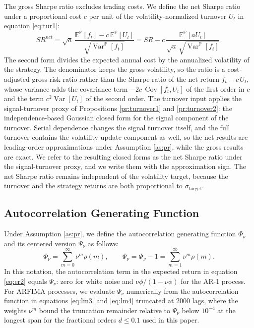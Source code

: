 \documentclass[hidelinks]{siamonline250211}
\DeclareMathOperator{\Var}{Var}
\DeclareMathOperator{\Cov}{Cov}
\begin{document}
The gross Sharpe ratio excludes trading costs. We define the net Sharpe ratio under a proportional cost $c$ per unit of the volatility-normalized turnover $U_{t}$ in equation \eqref{eq:tur1}:
\begin{equation} \label{eq:sr_net_def}
	SR^{net} = \sqrt{a} \, \frac{\mathbb{E}^{\mathbb{P}}[f_{t}] - c\,\mathbb{E}^{\mathbb{P}}[U_{t}]}{\sqrt{\Var^{\mathbb{P}}[f_{t}]}} = SR - c\, \frac{\mathbb{E}^{\mathbb{P}}[a U_{t}]}{\sqrt{a}\,\sqrt{\Var^{\mathbb{P}}[f_{t}]}}.
\end{equation}
The second form divides the expected annual cost by the annualized volatility of the strategy. The denominator keeps the gross volatility, so the ratio is a cost-adjusted gross-risk ratio rather than the Sharpe ratio of the net return $f_{t}-c\,U_{t}$, whose variance adds the covariance term $-2c\,\Cov[f_{t},U_{t}]$ of the first order in $c$ and the term $c^{2}\Var[U_{t}]$ of the second order. The turnover input applies the signal-turnover proxy of Propositions \ref{pr:turnover1} and \ref{pr:turnover2}: the independence-based Gaussian closed form for the signal component of the turnover. Serial dependence changes the signal turnover itself, and the full turnover contains the volatility-update component as well, so the net results are leading-order approximations under Assumption \ref{as:pr}, while the gross results are exact. We refer to the resulting closed forms as the net Sharpe ratio under the signal-turnover proxy, and we write them with the approximation sign. The net Sharpe ratio remains independent of the volatility target, because the turnover and the strategy returns are both proportional to $\sigma_{\mathrm{target}}$.





\subsection{Autocorrelation Generating Function}

Under Assumption \ref{as:pr}, we define the autocorrelation generating function $\Phi_{\nu}$ and its centered version $\Psi_{\nu}$ as follows:
\begin{equation} \label{eq:sr_phi}
	\Phi_{\nu} = \sum^{\infty}_{m=0} \nu^{m}\rho(m), \qquad \Psi_{\nu} = \Phi_{\nu} - 1 = \sum^{\infty}_{m=1} \nu^{m}\rho(m).
\end{equation}
In this notation, the autocorrelation term in the expected return in equation \eqref{eq:er2} equals $\Psi_{\nu}$: zero for white noise and $\nu\phi/(1-\nu\phi)$ for the AR-1 process. For ARFIMA processes, we evaluate $\Psi_{\nu}$ numerically from the autocorrelation function in equations \eqref{eq:lm3} and \eqref{eq:lm4} truncated at $2000$ lags, where the weights $\nu^{m}$ bound the truncation remainder relative to $\Psi_{\nu}$ below $10^{-4}$ at the longest span for the fractional orders $d \leq 0.1$ used in this paper.
\end{document}

